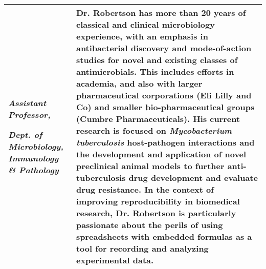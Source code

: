 \begin{table}[!h]
{\begin{tabular}[t]{>{\raggedright\arraybackslash}p{14em}>{\raggedright\arraybackslash}p{35em}}
  \textit{Assistant Professor,}
  
  \textit{Dept. of Microbiology, Immunology \& Pathology} & Dr. Robertson has more than 20 years of classical and clinical microbiology
  experience, with an emphasis in antibacterial discovery and mode-of-action studies
  for novel and existing classes of antimicrobials. This includes efforts in
  academia, and also with larger pharmaceutical corporations (Eli Lilly and Co)
  and smaller bio-pharmaceutical groups (Cumbre Pharmaceuticals). His current
  research is focused on \textit{Mycobacterium tuberculosis} host-pathogen
  interactions and the development and application of novel preclinical animal
  models to further anti-tuberculosis drug development and evaluate drug
  resistance. In the context of improving reproducibility in biomedical research,
  Dr. Robertson is particularly passionate about the perils of using spreadsheets
  with embedded formulas as a tool for recording and analyzing experimental data.\\
\bottomrule
\end{tabular}}
\end{table}
